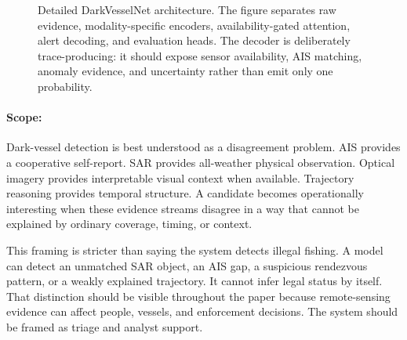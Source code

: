 \documentclass{article}
\makeatletter
\renewcommand{\scriptsize}{\@setfontsize\scriptsize\@viipt\@viiipt}
\renewcommand{\tiny}{\@setfontsize\tiny\@vipt\@viipt}
\makeatother
\begin{document}
\begin{figure}[t]
\caption{Detailed DarkVesselNet architecture. The figure separates raw evidence, modality-specific encoders, availability-gated attention, alert decoding, and evaluation heads. The decoder is deliberately trace-producing: it should expose sensor availability, AIS matching, anomaly evidence, and uncertainty rather than emit only one probability.}
\label{fig:darkvessel-architecture}
\end{figure}

\paragraph{Scope:}

Dark-vessel detection is best understood as a disagreement problem. AIS provides a cooperative self-report. SAR provides all-weather physical observation. Optical imagery provides interpretable visual context when available. Trajectory reasoning provides temporal structure. A candidate becomes operationally interesting when these evidence streams disagree in a way that cannot be explained by ordinary coverage, timing, or context.

This framing is stricter than saying the system detects illegal fishing. A model can detect an unmatched SAR object, an AIS gap, a suspicious rendezvous pattern, or a weakly explained trajectory. It cannot infer legal status by itself. That distinction should be visible throughout the paper because remote-sensing evidence can affect people, vessels, and enforcement decisions. The system should be framed as triage and analyst support.
\end{document}
